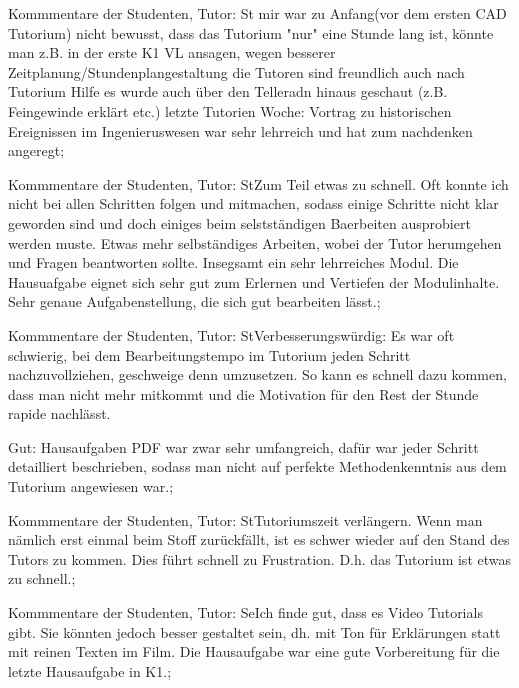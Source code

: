 \documentclass[10pt]{beamer}
\begin{document}
\begin{frame}[fragile]{Kommmentare der Studenten, Tutor: St}   mir war zu Anfang(vor dem ersten CAD Tutorium) nicht bewusst, dass das Tutorium "nur" eine Stunde lang ist, könnte man z.B. in der erste K1 VL ansagen, wegen besserer Zeitplanung/Stundenplangestaltung     die Tutoren sind freundlich   auch nach Tutorium Hilfe   es wurde auch über den Telleradn hinaus geschaut (z.B. Feingewinde erklärt etc.)   letzte Tutorien Woche: Vortrag zu historischen Ereignissen im Ingenieruswesen war sehr lehrreich und hat zum nachdenken angeregt;
 \end{frame}
\begin{frame}[fragile]{Kommmentare der Studenten, Tutor: St}Zum Teil etwas zu schnell. Oft konnte ich nicht bei allen Schritten folgen und mitmachen, sodass einige Schritte nicht klar geworden sind und doch einiges beim selstständigen Baerbeiten ausprobiert werden muste. Etwas mehr selbständiges Arbeiten, wobei der Tutor herumgehen und Fragen beantworten sollte. Insegsamt ein sehr lehrreiches Modul. Die Hausuafgabe eignet sich sehr gut zum Erlernen und Vertiefen der Modulinhalte. Sehr genaue Aufgabenstellung, die sich gut bearbeiten lässt.;
 \end{frame}
\begin{frame}[fragile]{Kommmentare der Studenten, Tutor: St}Verbesserungswürdig: Es war oft schwierig, bei dem Bearbeitungstempo im Tutorium jeden Schritt nachzuvollziehen, geschweige denn umzusetzen. So kann es schnell dazu kommen, dass man nicht mehr mitkommt und die Motivation für den Rest der Stunde rapide nachlässt.
 
 Gut: Hausaufgaben PDF war zwar sehr umfangreich, dafür war jeder Schritt detailliert beschrieben, sodass man nicht auf perfekte Methodenkenntnis aus dem Tutorium angewiesen war.;
 \end{frame}
\begin{frame}[fragile]{Kommmentare der Studenten, Tutor: St}Tutoriumszeit verlängern. Wenn man nämlich erst einmal beim Stoff zurückfällt, ist es schwer wieder auf den Stand des Tutors zu kommen. Dies führt schnell zu Frustration. D.h. das Tutorium ist etwas zu schnell.;
 \end{frame}
\begin{frame}[fragile]{Kommmentare der Studenten, Tutor: Se}Ich finde gut, dass es Video Tutorials gibt. Sie könnten jedoch besser gestaltet sein, dh. mit Ton für Erklärungen statt mit reinen Texten im Film. Die Hausaufgabe war eine gute Vorbereitung für die letzte Hausaufgabe in K1.;
 \end{frame}
\end{document}
